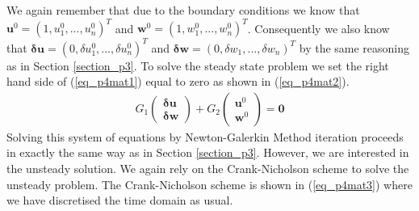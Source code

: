 \documentclass[11pt,fleqn]{article}
\theoremstyle{defstyle}
\begin{document}
We again remember that due to the boundary conditions we know that $\mathbf{u}^0 = \left(1,u^0_1,...,u^0_n \right)^T$ and $\mathbf{w}^0 = \left(1,w^0_1,...,w^0_n \right)^T$. Consequently we also know that $\mathbf{\delta u} = \left(0,\delta u^0_1,...,\delta u^0_n \right)^T$ and $\mathbf{\delta w} = \left(0,\delta w_1,...,\delta w_n \right)^T$ by the same reasoning as in Section \ref{section_p3}. To solve the steady state problem we set the right hand side of (\ref{eq_p4mat1}) equal to zero as shown in (\ref{eq_p4mat2}). 
\begin{equation}
\begin{aligned}
G_1 \begin{pmatrix}
\mathbf{\delta u} \\ \mathbf{\delta w} 
\end{pmatrix} + G_2 \begin{pmatrix}
\mathbf{u}^0 \\ \mathbf{w}^0 
\end{pmatrix}
= \mathbf{0}
\end{aligned}
\label{eq_p4mat2}
\end{equation}
Solving this system of equations by Newton-Galerkin Method iteration proceeds in exactly the same way as in Section \ref{section_p3}. However, we are interested in the unsteady solution. We again rely on the Crank-Nicholson scheme to solve the unsteady problem. The Crank-Nicholson scheme is shown in (\ref{eq_p4mat3}) where we have discretised the time domain as usual.
\end{document}
